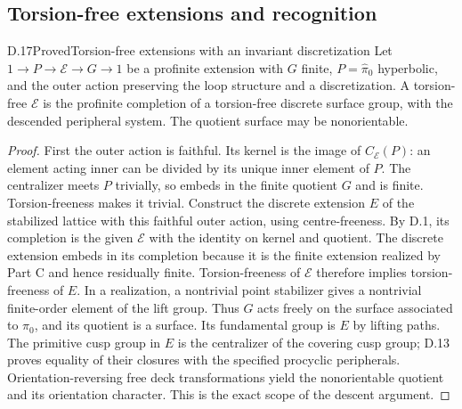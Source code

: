 \subsection{Torsion-free extensions and recognition}

\begin{claim}{D.17}{Proved}{Torsion-free extensions with an invariant discretization}
Let $1\to P\to\mathcal E\to G\to1$ be a profinite extension with $G$ finite, $P=\widehat\pi_0$ hyperbolic, and the outer action preserving the loop structure and a discretization. A torsion-free $\mathcal E$ is the profinite completion of a torsion-free discrete surface group, with the descended peripheral system. The quotient surface may be nonorientable.
\end{claim}
\begin{proof}
First the outer action is faithful. Its kernel is the image of $C_{\mathcal E}(P)$: an element acting inner can be divided by its unique inner element of $P$. The centralizer meets $P$ trivially, so embeds in the finite quotient $G$ and is finite. Torsion-freeness makes it trivial. Construct the discrete extension $E$ of the stabilized lattice with this faithful outer action, using centre-freeness. By D.1, its completion is the given $\mathcal E$ with the identity on kernel and quotient. The discrete extension embeds in its completion because it is the finite extension realized by Part C and hence residually finite. Torsion-freeness of $\mathcal E$ therefore implies torsion-freeness of $E$. In a realization, a nontrivial point stabilizer gives a nontrivial finite-order element of the lift group. Thus $G$ acts freely on the surface associated to $\pi_0$, and its quotient is a surface. Its fundamental group is $E$ by lifting paths. The primitive cusp group in $E$ is the centralizer of the covering cusp group; D.13 proves equality of their closures with the specified procyclic peripherals. Orientation-reversing free deck transformations yield the nonorientable quotient and its orientation character. This is the exact scope of the descent argument.
\end{proof}

